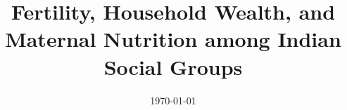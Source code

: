 \documentclass[12pt]{article}
\begin{document}
\title{Fertility, Household Wealth, and Maternal Nutrition among Indian Social Groups}
\date{\today}
\maketitle








%         





%         
\end{document}
